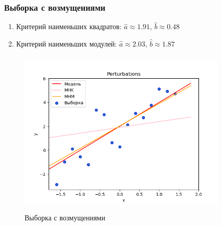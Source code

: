 	\subsubsection{Выборка с возмущениями}
		\begin{enumerate}
			\item{Критерий наименьших квадратов:}
			$\hat{a}\approx 1.91$, $\hat{b}\approx 0.48$
			\item{Критерий наименьших модулей:}
			$\hat{a}\approx 2.03$, $\hat{b}\approx 1.87$
		\end{enumerate}
		\begin{figure}[H]
			\centering
			\includegraphics[width = 10cm, height = 8cm]{pics/Perturbations.png}
			\caption{Выборка с возмущениями}
			\label{w_pert}
		\end{figure}

	
